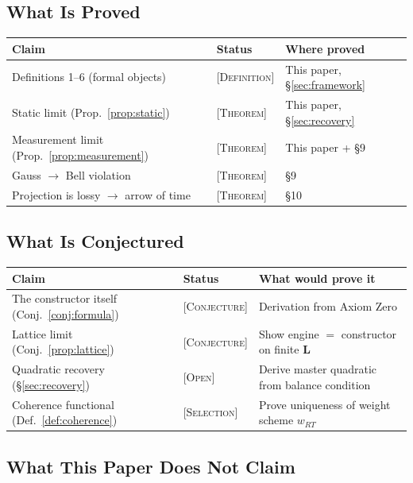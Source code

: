 \documentclass[11pt,a4paper]{article}
\newcommand{\etag}[1]{{\normalfont\textsc{\footnotesize [#1]}}}
\theoremstyle{compact}
\begin{document}
\subsection*{What Is Proved}

\begin{center}
\small
\begin{tabular}{lll}
\toprule
\textbf{Claim} & \textbf{Status} & \textbf{Where proved} \\
\midrule
Definitions 1--6 (formal objects) & \etag{Definition} & This paper, \S\ref{sec:framework} \\
Static limit (Prop.~\ref{prop:static}) & \etag{Theorem} & This paper, \S\ref{sec:recovery} \\
Measurement limit (Prop.~\ref{prop:measurement}) & \etag{Theorem} & This paper + \cite{lifecycle} \S9 \\
Gauss $\to$ Bell violation & \etag{Theorem} & \cite{lifecycle} \S9 \\
Projection is lossy $\to$ arrow of time & \etag{Theorem} & \cite{lifecycle} \S10 \\
\bottomrule
\end{tabular}
\end{center}

\subsection*{What Is Conjectured}

\begin{center}
\small
\begin{tabular}{lll}
\toprule
\textbf{Claim} & \textbf{Status} & \textbf{What would prove it} \\
\midrule
The constructor itself (Conj.~\ref{conj:formula}) & \etag{Conjecture} & Derivation from Axiom Zero \\
Lattice limit (Conj.~\ref{prop:lattice}) & \etag{Conjecture} & Show engine $=$ constructor on finite $\mathbf{L}$ \\
Quadratic recovery (\S\ref{sec:recovery}) & \etag{Open} & Derive master quadratic from balance condition \\
Coherence functional (Def.~\ref{def:coherence}) & \etag{Selection} & Prove uniqueness of weight scheme $w_{RT}$ \\
\bottomrule
\end{tabular}
\end{center}

\subsection*{What This Paper Does Not Claim}
\end{document}
